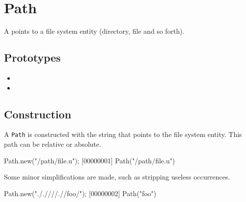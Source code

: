 \section{Path}

A  points to a file system entity (directory, file and so
forth).

\subsection{Prototypes}
\begin{itemize}
\item {}
\item {}
\end{itemize}

\subsection{Construction}

A \lstinline|Path| is constructed with the string that points to the
file system entity. This path can be relative or absolute.

\begin{urbiscript}[firstnumber=1]
Path.new("/path/file.u");
[00000001] Path("/path/file.u")
\end{urbiscript}

Some minor simplifications are made, such as stripping useless
 occurrences.

\begin{urbiscript}
Path.new("././///.//foo/");
[00000002] Path("foo")
\end{urbiscript}

